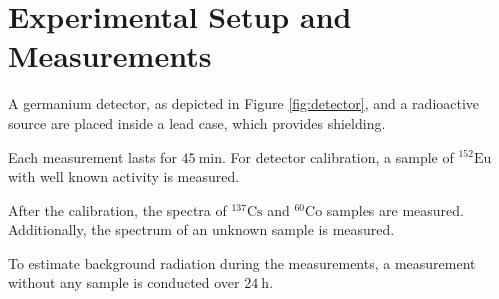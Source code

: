 \section{Experimental Setup and Measurements}
\label{sec:procedure}
\noindent
A germanium detector, as depicted in Figure \ref{fig:detector}, 
and a radioactive source are placed inside a lead case, which 
provides shielding.

\noindent
Each measurement lasts for $\SI{45}{\minute}$. For detector 
calibration, a sample of $^{152}\text{Eu}$ with well known activity
is measured.

\noindent
After the calibration, the spectra of $^{137}\text{Cs}$ and 
$^{60}\text{Co}$ samples are measured. Additionally, the spectrum 
of an unknown sample is measured.

\noindent
To estimate background radiation during the measurements, a 
measurement without any sample is conducted over $\SI{24}{\hour}$.